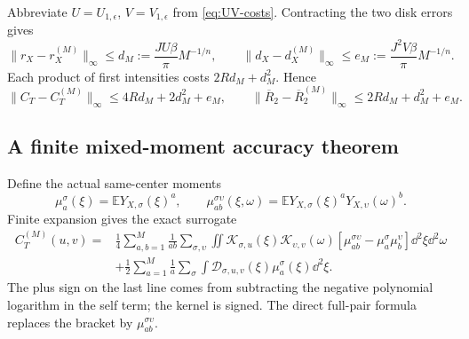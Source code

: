 Abbreviate $U=U_{1,\epsilon}$, $V=V_{1,\epsilon}$ from
\eqref{eq:UV-costs}. Contracting the two disk errors gives
\[
 \|r_X-r_X^{(M)}\|_\infty\le d_M:=\frac{JU\beta}{\pi}M^{-1/n},
 \qquad
 \|d_X-d_X^{(M)}\|_\infty\le e_M:=\frac{J^2V\beta}{\pi}M^{-1/n}.
\]
Each product of first intensities costs $2Rd_M+d_M^2$. Hence
\begin{equation}\label{eq:joint-bias}
 \|C_T-C_T^{(M)}\|_\infty\le4Rd_M+2d_M^2+e_M,
 \qquad
 \|\overline R_2-\overline R_2^{(M)}\|_\infty
       \le2Rd_M+d_M^2+e_M.
\end{equation}

\subsection{A finite mixed-moment accuracy theorem}

Define the actual same-center moments
\[
 \mu_a^\sigma(\xi)=\mathbb E Y_{X,\sigma}(\xi)^a,\qquad
 \mu_{ab}^{\sigma\upsilon}(\xi,\omega)
   =\mathbb E Y_{X,\sigma}(\xi)^aY_{X,\upsilon}(\omega)^b.
\]
Finite expansion gives the exact surrogate
\begin{align}
 C_T^{(M)}(u,v)
  ={}&\frac14\sum_{a,b=1}^M\frac1{ab}\sum_{\sigma,\upsilon}
     \iint\mathcal K_{\sigma,u}(\xi)\mathcal K_{\upsilon,v}(\omega)
       [\mu_{ab}^{\sigma\upsilon}-\mu_a^\sigma\mu_b^\upsilon]
                                      \dd^2\xi\dd^2\omega\nonumber\\
   &+\frac12\sum_{a=1}^M\frac1a\sum_\sigma
        \int\mathcal D_{\sigma,u,v}(\xi)\mu_a^\sigma(\xi)\dd^2\xi.
                                                        \label{eq:joint-moments}
\end{align}
The plus sign on the last line comes from subtracting the negative
polynomial logarithm in the self term; the kernel is signed. The
direct full-pair formula replaces the bracket by $\mu_{ab}^{\sigma\upsilon}$.

